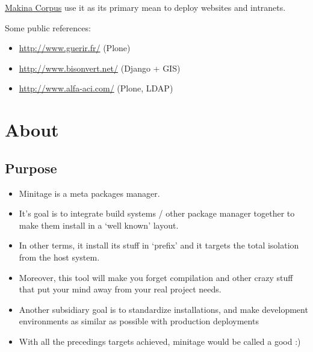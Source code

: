 \documentclass[letterpaper,10pt,english]{sphinxmanual}
\begin{document}
\href{http://www.makina-corpus.com}{Makina Corpus} use it as its primary mean to deploy websites and intranets.

Some public references:
\begin{itemize}
\item {} 
\href{http://www.guerir.fr/}{http://www.guerir.fr/} (Plone)

\item {} 
\href{http://www.bisonvert.net/}{http://www.bisonvert.net/} (Django + GIS)

\item {} 
\href{http://www.alfa-aci.com/}{http://www.alfa-aci.com/} (Plone, LDAP)

\end{itemize}


\section{About}
\label{about:about}\label{about::doc}

\subsection{Purpose}
\label{about:purpose}\begin{itemize}
\item {} 
Minitage is a meta packages manager.

\item {} 
It's goal is to integrate build systems / other package manager together to make them install in a `well known' layout.

\item {} 
In other terms, it install its stuff in `prefix' and it targets the total isolation from the host system.

\item {} 
Moreover, this tool will make you forget compilation and other crazy stuff that put your mind away from your real project needs.

\item {} 
Another subsidiary goal is to standardize installations, and make development environments as similar as possible with production deployments

\item {} 
With all the precedings targets achieved, minitage would be called a good  :)

\end{itemize}
\end{document}
